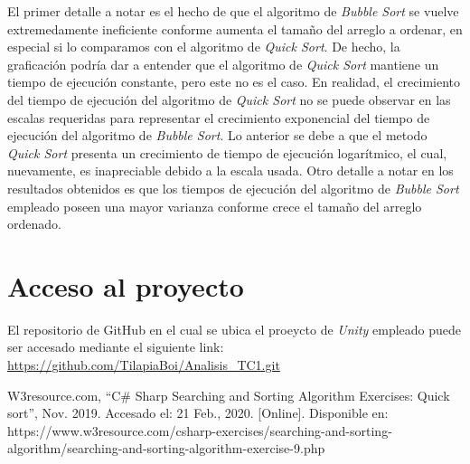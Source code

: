 \documentclass[conference]{IEEEtran}
\begin{document}
El primer detalle a notar es el hecho de que el algoritmo de \textit{Bubble Sort} se vuelve extremedamente ineficiente conforme
aumenta el tamaño del arreglo a ordenar, en especial si lo comparamos con el algoritmo de \textit{Quick Sort}. De hecho, la graficación
podría dar a entender que el algoritmo de \textit{Quick Sort} mantiene un tiempo de ejecución constante, pero este no es el caso. En realidad,
el crecimiento del tiempo de ejecución del algoritmo de \textit{Quick Sort} no se puede observar en las escalas requeridas para representar
el crecimiento exponencial del tiempo de ejecución del algoritmo de \textit{Bubble Sort}. Lo anterior se debe a que el metodo \textit{Quick Sort}
presenta un crecimiento de tiempo de ejecución logarítmico, el cual, nuevamente, es inapreciable debido a la escala usada.
Otro detalle a notar en los resultados obtenidos es que los tiempos de ejecución del algoritmo de \textit{Bubble Sort} empleado poseen 
una mayor varianza conforme crece el tamaño del arreglo ordenado.

\section{Acceso al proyecto}
El repositorio de GitHub en el cual se ubica el proeycto de \textit{Unity} empleado puede ser accesado mediante el siguiente link: \url{https://github.com/TilapiaBoi/Analisis_TC1.git}

\begin{thebibliography}{00}
 W3resource.com, ``C\# Sharp Searching and Sorting Algorithm Exercises: Quick sort'', Nov. 2019. Accesado el: 21 Feb., 2020. [Online]. Disponible en: https://www.w3resource.com/csharp-exercises/searching-and-sorting-algorithm/searching-and-sorting-algorithm-exercise-9.php
\end{thebibliography}
\end{document}
